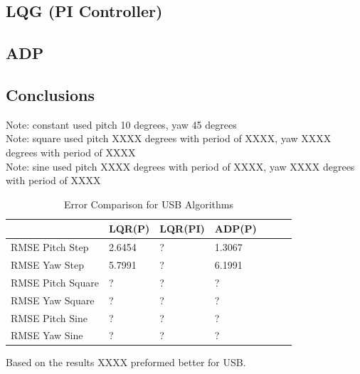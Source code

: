 \subsection{LQG (PI Controller)}

\subsection{ADP}

\subsection{Conclusions}
Note: constant used pitch 10 degrees, yaw 45 degrees\\
Note: square used pitch XXXX degrees with period of XXXX, yaw XXXX degrees with period of XXXX\\
Note: sine used pitch XXXX degrees with period of XXXX, yaw XXXX degrees with period of XXXX\\
\begin{table}[h!]
    \centering
    \begin{tabular}{l|l|l|l|l|l|l}
        \toprule
        \textbf{} & \textbf{LQR(P)} & \textbf{LQR(PI)} &
        \textbf{ADP(P)} \\
        \toprule
        RMSE Pitch Step & 2.6454 & ? & 1.3067 \\
        RMSE Yaw Step & 5.7991 & ? & 6.1991 \\
        RMSE Pitch Square & ? & ? & ? \\
        RMSE Yaw Square & ? & ? & ? \\
        RMSE Pitch Sine & ? & ? & ? \\
        RMSE Yaw Sine & ? & ? & ? \\
        \bottomrule
    \end{tabular}
    \caption{Error Comparison for USB Algorithms}
    \label{tab:USB_RMSE}
\end{table}
Based on the results XXXX preformed better for USB.

